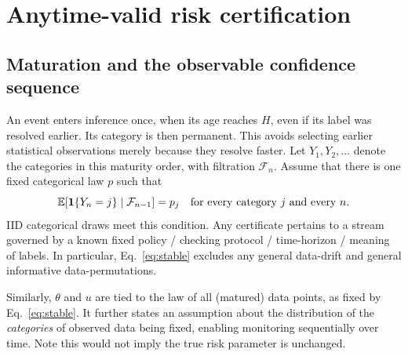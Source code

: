 \section{Anytime-valid risk certification}\label{sec:sequential}
\subsection{Maturation and the observable confidence sequence}
An event enters inference once, when its age reaches $H$, even if its label was resolved earlier. Its category is then permanent. This avoids selecting earlier statistical observations merely because they resolve faster. Let $Y_1,Y_2,\ldots$ denote the categories in this maturity order, with filtration $\mathcal F_n$. Assume that there is one fixed categorical law $p$ such that
\begin{equation}\label{eq:stable}
 \mathbb E[\mathbf 1\{Y_n=j\}\mid\mathcal F_{n-1}]=p_j
 \quad\text{for every category }j\text{ and every }n.
\end{equation}
IID categorical draws meet this condition. Any certificate pertains to a stream governed by a known fixed policy / checking protocol / time-horizon / meaning of labels. In particular, Eq.~\eqref{eq:stable} excludes any general data-drift and general informative data-permutations.

Similarly, $\theta$ and $u$ are tied to the law of all (matured) data points, as fixed by Eq.~\eqref{eq:stable}. It further states an assumption about the distribution of the \emph{categories} of observed data being fixed, enabling monitoring sequentially over time. Note this would not imply the true risk parameter is unchanged.

